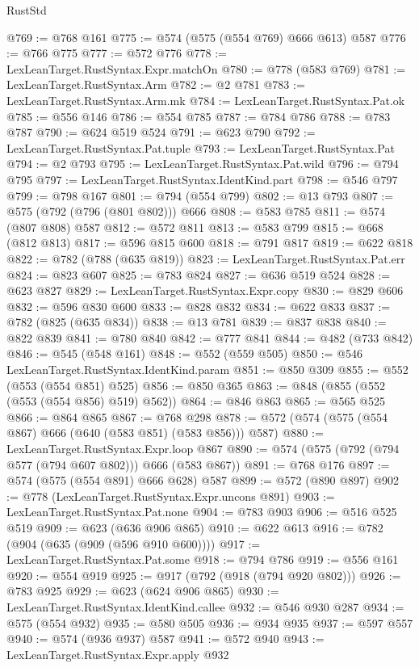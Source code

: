\begin{lexlean}{RustStd}
\begin{coremodule}
{\begin{coremodule}
{{{{{{{{{{{{{{{{@769 := @768 @161
@775 := @574 (@575 (@554 @769) @666 @613) @587
@776 := @766 @775
@777 := @572 @776
@778 := LexLeanTarget.RustSyntax.Expr.matchOn
@780 := @778 (@583 @769)
@781 := LexLeanTarget.RustSyntax.Arm
@782 := @2 @781
@783 := LexLeanTarget.RustSyntax.Arm.mk
@784 := LexLeanTarget.RustSyntax.Pat.ok
@785 := @556 @146
@786 := @554 @785
@787 := @784 @786
@788 := @783 @787
@790 := @624 @519 @524
@791 := @623 @790
@792 := LexLeanTarget.RustSyntax.Pat.tuple
@793 := LexLeanTarget.RustSyntax.Pat
@794 := @2 @793
@795 := LexLeanTarget.RustSyntax.Pat.wild
@796 := @794 @795
@797 := LexLeanTarget.RustSyntax.IdentKind.part
@798 := @546 @797
@799 := @798 @167
@801 := @794 (@554 @799)
@802 := @13 @793
@807 := @575 (@792 (@796 (@801 @802))) @666
@808 := @583 @785
@811 := @574 (@807 @808) @587
@812 := @572 @811
@813 := @583 @799
@815 := @668 (@812 @813)
@817 := @596 @815 @600
@818 := @791 @817
@819 := @622 @818
@822 := @782 (@788 (@635 @819))
@823 := LexLeanTarget.RustSyntax.Pat.err
@824 := @823 @607
@825 := @783 @824
@827 := @636 @519 @524
@828 := @623 @827
@829 := LexLeanTarget.RustSyntax.Expr.copy
@830 := @829 @606
@832 := @596 @830 @600
@833 := @828 @832
@834 := @622 @833
@837 := @782 (@825 (@635 @834))
@838 := @13 @781
@839 := @837 @838
@840 := @822 @839
@841 := @780 @840
@842 := @777 @841
@844 := @482 (@733 @842)
@846 := @545 (@548 @161)
@848 := @552 (@559 @505)
@850 := @546 LexLeanTarget.RustSyntax.IdentKind.param
@851 := @850 @309
@855 := @552 (@553 (@554 @851) @525)
@856 := @850 @365
@863 := @848 (@855 (@552 (@553 (@554 @856) @519) @562))
@864 := @846 @863
@865 := @565 @525
@866 := @864 @865
@867 := @768 @298
@878 := @572 (@574 (@575 (@554 @867) @666 (@640 (@583 @851) (@583 @856))) @587)
@880 := LexLeanTarget.RustSyntax.Expr.loop @867
@890 := @574 (@575 (@792 (@794 @577 (@794 @607 @802))) @666 (@583 @867))
@891 := @768 @176
@897 := @574 (@575 (@554 @891) @666 @628) @587
@899 := @572 (@890 @897)
@902 := @778 (LexLeanTarget.RustSyntax.Expr.uncons @891)
@903 := LexLeanTarget.RustSyntax.Pat.none
@904 := @783 @903
@906 := @516 @525 @519
@909 := @623 (@636 @906 @865)
@910 := @622 @613
@916 := @782 (@904 (@635 (@909 (@596 @910 @600))))
@917 := LexLeanTarget.RustSyntax.Pat.some
@918 := @794 @786
@919 := @556 @161
@920 := @554 @919
@925 := @917 (@792 (@918 (@794 @920 @802)))
@926 := @783 @925
@929 := @623 (@624 @906 @865)
@930 := LexLeanTarget.RustSyntax.IdentKind.callee
@932 := @546 @930 @287
@934 := @575 (@554 @932)
@935 := @580 @505
@936 := @934 @935
@937 := @597 @557
@940 := @574 (@936 @937) @587
@941 := @572 @940
@943 := LexLeanTarget.RustSyntax.Expr.apply @932
}}}}}}}}}}}}}}}}
\end{coremodule}}
\end{coremodule}
\end{lexlean}
